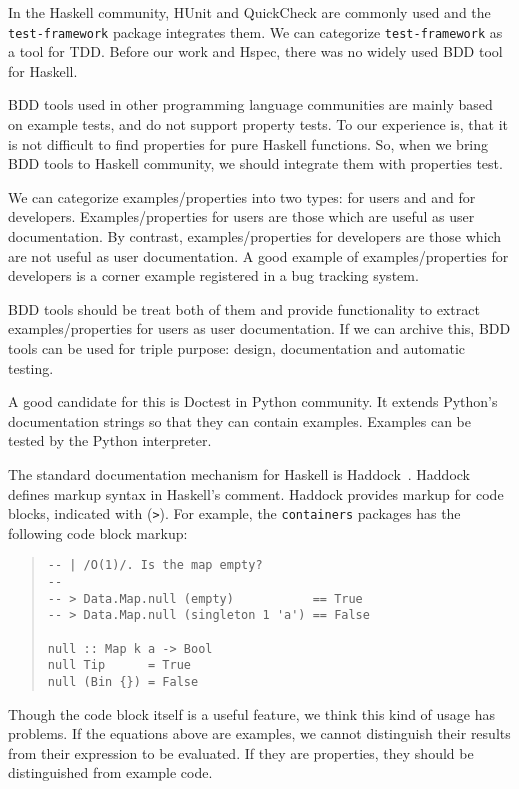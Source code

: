 \documentclass[preprint]{sigplanconf}
\newcommand{\hspec}{Hspec}
\newcommand{\doctest}{Doctest}
\begin{document}
In the Haskell community, HUnit and QuickCheck are commonly used %
and the {\tt test-framework} package integrates them.
We can categorize {\tt test-framework} as
a tool for TDD.
Before our work and \hspec{}, there was no widely used BDD tool for Haskell.

BDD tools used in other programming language communities are
mainly based on example tests,
and do not support property tests.
To our experience is, that it is not difficult to find properties for
pure Haskell functions.
So, when we bring BDD tools to
Haskell community, we should integrate them with properties test.

We can categorize examples/properties into two types: for users and
and for developers.
Examples/properties for users are those which are useful as user documentation.
By contrast, examples/properties for developers are
those which are not useful as user documentation.
A good example of examples/properties for developers
is a corner example registered in a bug tracking system.

BDD tools should be treat both of them and provide functionality
to extract examples/properties for users as user documentation.
If we can archive this, BDD tools can be used for
triple purpose: design, documentation and automatic testing.

A good candidate for this is \doctest{} in Python community.
It extends Python's documentation strings so that they
can contain examples.
Examples can be tested by the Python interpreter.

The standard documentation mechanism for Haskell is
Haddock~\cite{haddock}.
Haddock defines markup syntax in Haskell's comment.
Haddock provides markup for code blocks, indicated with ({\tt >}).
For example, the {\tt containers} packages has the following code block markup:

\begin{quote}
\small
\begin{verbatim}
-- | /O(1)/. Is the map empty?
--
-- > Data.Map.null (empty)           == True
-- > Data.Map.null (singleton 1 'a') == False

null :: Map k a -> Bool
null Tip      = True
null (Bin {}) = False
\end{verbatim}
\end{quote}

\noindent Though the code block itself is a useful feature,
we think this kind of usage has problems.
If the equations above are examples, we cannot distinguish
their results from their expression to be evaluated.
If they are properties, they should be distinguished
from example code.
\end{document}
